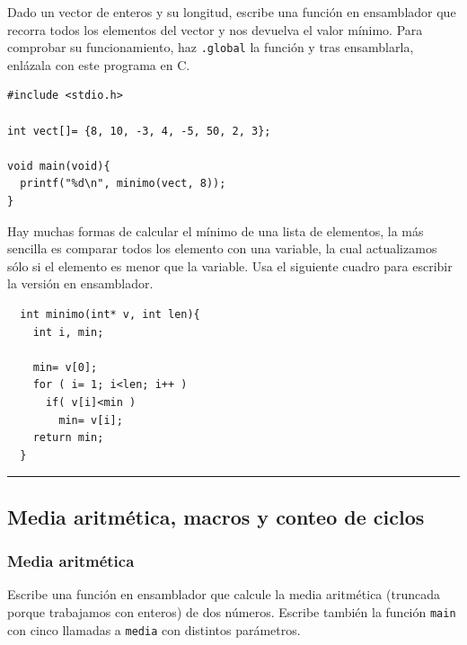 Dado un vector de enteros y su longitud, escribe una función en ensamblador
que recorra todos los elementos del vector y nos devuelva el valor mínimo.
Para comprobar su funcionamiento, haz {\tt .global} la función y tras ensamblarla,
enlázala con este programa en C.

\begin{lstlisting}
#include <stdio.h>

int vect[]= {8, 10, -3, 4, -5, 50, 2, 3};

void main(void){
  printf("%d\n", minimo(vect, 8));
}
\end{lstlisting}

Hay muchas formas de calcular el mínimo de una lista de elementos, la más sencilla es
comparar todos los elemento con una variable, la cual actualizamos sólo si el elemento es
menor que la variable. Usa el siguiente cuadro para escribir la versión en ensamblador.

\begin{center}
\begin{myfbox}
\small
\begin{minipage}{0.92\linewidth}
\begin{center}
\begin{minipage}{0.6\linewidth}
\begin{verbatim}
  int minimo(int* v, int len){
    int i, min;

    min= v[0];
    for ( i= 1; i<len; i++ )
      if( v[i]<min )
        min= v[i];
    return min;
  }
\end{verbatim}
\end{minipage}
\end{center}
\begin{center}
\colorbox[gray]{1}{\rule{0cm}{7cm}\rule{11cm}{0cm}}
\end{center}
\end{minipage}
\end{myfbox}
\end{center}

\subsection{Media aritmética, macros y conteo de ciclos}

\subsubsection{Media aritmética}

Escribe una función en ensamblador que calcule la media aritmética (truncada porque
trabajamos con enteros) de dos números. Escribe también la función {\tt main} con 
cinco llamadas a {\tt media} con distintos parámetros.

